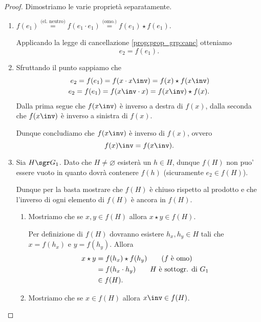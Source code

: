 \begin{proof} Dimostriamo le varie proprietà separatamente.
    \begin{enumerate}[label={(\roman*)}]
        \item $f(e_1) \stackrel{\text{(el. neutro)}}{=} f(e_1 \cdot e_1) \stackrel{\text{(omo.)}}{=} f(e_1) \star f(e_1)$.
        
        Applicando la legge di cancellazione \ref{prop:prop_grp:canc} otteniamo \[
            e_2 = f(e_1).    
        \]
        \item Sfruttando il punto  sappiamo che \begin{align*}
            e_2 = f(e_1) = f(x \cdot x\inv) = f(x)\star f(x\inv) \\
            e_2 = f(e_1) = f(x\inv \cdot x) = f(x\inv)\star f(x).
        \end{align*} Dalla prima segue che $f(x\inv)$ è inverso a destra di $f(x)$, dalla seconda che $f(x\inv)$ è inverso a sinistra di $f(x)$.

        Dunque concludiamo che $f(x\inv)$ è inverso di $f(x)$, ovvero \[
            f(x)\inv = f(x\inv).    
        \]
        \item Sia $H \sgr G_1$. Dato che $H \neq \varnothing$ esisterà un $h \in H$, dunque $f(H)$ non puo' essere vuoto in quanto dovrà contenere $f(h)$ (sicuramente $e_2 \in f(H)$).
        
        Dunque per la  basta mostrare che $f(H)$ è chiuso rispetto al prodotto e che l'inverso di ogni elemento di $f(H)$ è ancora in $f(H)$.

        \begin{enumerate}[label={(\arabic*)}]
            \item Mostriamo che se $x, y \in f(H)$ allora $x\star y \in f(H)$.
            
            Per definizione di $f(H)$ dovranno esistere $h_x, h_y \in H$ tali che $x = f(h_x)$ e $y = f(h_y)$. Allora \begin{align*}
                x\star y &= f(h_x)\star f(h_y) \tag*{\text{($f$ è omo)}}\\
                &= f(h_x \cdot h_y) \tag*{$H$ è sottogr. di $G_1$}\\
                &\in f(H).
            \end{align*}
            \item Mostriamo che se $x \in f(H)$ allora $x\inv \in f(H)$.
            

\end{enumerate}
\end{enumerate}
\end{proof}
